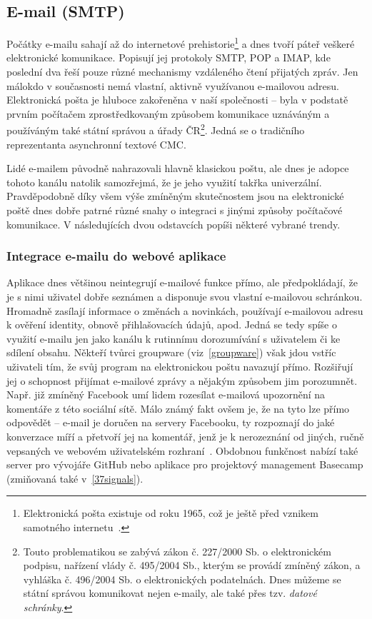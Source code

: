 \documentclass[12pt,oneside,final]{fithesis2}
\begin{document}
\subsection{E-mail (SMTP)}\label{email}
Počátky e-mailu sahají až do internetové prehistorie\footnote{Elektronická pošta existuje od roku 1965, což je ještě před vznikem samotného internetu~\cite{vanvleck2012electronic}.} a dnes tvoří páteř veškeré elektronické komunikace. Popisují jej protokoly SMTP, POP a IMAP, kde poslední dva řeší pouze různé mechanismy vzdáleného čtení přijatých zpráv. Jen málokdo v současnosti nemá vlastní, aktivně využívanou e-mailovou adresu. Elektronická pošta je hluboce zakořeněna v naší společnosti -- byla v podstatě prvním počítačem zprostředkovaným způsobem komunikace uznáváným a používáným také státní správou a úřady ČR\footnote{Touto problematikou se zabývá zákon č. 227/2000 Sb. o elektronickém podpisu, nařízení vlády č. 495/2004 Sb., kterým se provádí zmíněný zákon, a vyhláška č. 496/2004 Sb. o elektronických podatelnách. Dnes můžeme se státní správou komunikovat nejen e-maily, ale také přes tzv. \emph{datové schránky}.}. Jedná se o tradičního reprezentanta asynchronní textové CMC.

Lidé e-mailem původně nahrazovali hlavně klasickou poštu, ale dnes je adopce tohoto kanálu natolik samozřejmá, že je jeho využití takřka univerzální. Pravděpodobně díky všem výše zmíněným skutečnostem jsou na elektronické poště dnes dobře patrné různé snahy o integraci s jinými způsoby počítačové komunikace. V následujících dvou odstavcích popíši některé vybrané trendy.

\subsubsection*{Integrace e-mailu do webové aplikace}\label{emailWebApp}
Aplikace dnes většinou neintegrují e-mailové funkce přímo, ale předpokládají, že je s nimi uživatel dobře seznámen a disponuje svou vlastní e-mailovou schránkou. Hromadně zasílají informace o změnách a novinkách, používají e-mailovou adresu k ověření identity, obnově přihlašovacích údajů, apod. Jedná se tedy spíše o využití e-mailu jen jako kanálu k rutinnímu dorozumívání s uživatelem či ke sdílení obsahu. Někteří tvůrci groupware (viz~\ref{groupware}) však jdou vstříc uživateli tím, že svůj program na elektronickou poštu navazují přímo. Rozšiřují jej o schopnost přijímat e-mailové zprávy a nějakým způsobem jim porozumnět. Např. již zmíněný Facebook umí lidem rozesílat e-mailová upozornění na komentáře z této sociální sítě. Málo známý fakt ovšem je, že na tyto lze přímo odpovědět -- e-mail je doručen na servery Facebooku, ty rozpoznají do jaké konverzace míří a přetvoří jej na komentář, jenž je k nerozeznání od jiných, ručně vepsaných ve webovém uživatelském rozhraní~\cite{whitnah2010replying}. Obdobnou funkčnost nabízí také server pro vývojáře GitHub nebo aplikace pro projektový management Basecamp (zmiňovaná také v~\ref{37signals}).
\end{document}
